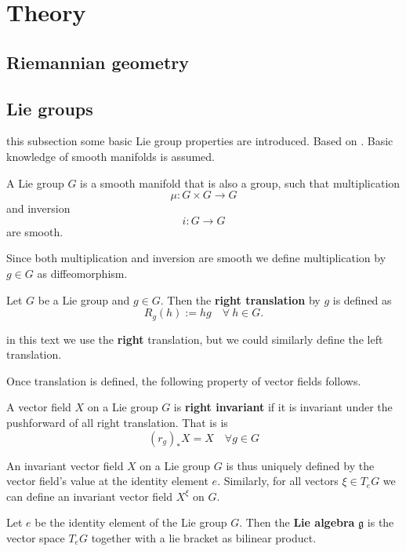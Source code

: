 
\section{Theory}
\subsection{Riemannian geometry}

\subsection{Lie groups}
this subsection some basic Lie group properties are introduced. Based on \cite{celledoni2016}. Basic knowledge of smooth manifolds is assumed.
\begin{definition}
  A Lie group  \(G\) is a smooth manifold that is also a group, such that multiplication
  \begin{equation}
    \mu : G \times G \rightarrow G
  \end{equation}
  and inversion
  \begin{equation}
    i : G  \rightarrow G
  \end{equation}
  are smooth.
\end{definition}
Since both  multiplication and inversion are smooth we define multiplication by  \(g \in G\) as diffeomorphism.
\begin{definition}
  Let  \(G\) be a Lie group and  \(g \in G\). Then the \textbf{right translation} by  \(g\) is defined as
  \begin{equation}
    R_g(h):= hg \quad  \forall \ h  \in G.
  \end{equation}
\end{definition}
\begin{remark}
  in this text we use the \textbf{right} translation, but we could similarly define the left translation.
\end{remark}
Once translation is defined, the following property of vector fields follows.
\begin{definition}
  A vector field  \(X\) on a Lie group  \(G\) is \textbf{right invariant} if it is invariant under the pushforward of all right translation. That is is
  \begin{equation}
    (r_g)_*X = X  \quad \forall g \in G
  \end{equation}
\end{definition}
An invariant vector field  \(X\) on a Lie group  \(G\) is thus uniquely defined by the vector field's value at the identity element  \(e\). Similarly, for all vectors  \(\xi \in T_eG\) we can define an invariant vector field   \(X^{\xi}\) on  \(G\).
\begin{definition}
  Let  \(e\) be the identity element of the Lie group  \(G\). Then the \textbf{Lie algebra}  \(\mathfrak{g}\) is the vector space  \(T_{e}G\) together with a lie bracket as bilinear product.
\end{definition}
